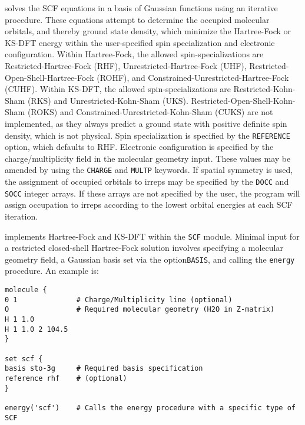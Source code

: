 \PSIfour solves the SCF equations in a basis of Gaussian functions using an
iterative procedure. These equations attempt to determine the occupied molecular
orbitals, and thereby ground state density, which minimize the Hartree-Fock or
KS-DFT energy within the user-specified spin specialization and electronic
configuration. Within Hartree-Fock, the allowed spin-specializations are
Restricted-Hartree-Fock (RHF), Unrestricted-Hartree-Fock (UHF),
Restricted-Open-Shell-Hartree-Fock (ROHF), and
Constrained-Unrestricted-Hartree-Fock (CUHF). Within KS-DFT, the allowed
spin-specializations are Restricted-Kohn-Sham (RKS) and Unrestricted-Kohn-Sham
(UKS). Restricted-Open-Shell-Kohn-Sham (ROKS) and
Constrained-Unrestricted-Kohn-Sham (CUKS) are not implemented, as they always
predict a ground state with positive definite spin density, which is not
physical. Spin specialization is specified by the \texttt{REFERENCE} option,
which defaults to RHF.
Electronic configuration is specified by the charge/multiplicity field in the
molecular geometry input. These values may be amended by using the
\texttt{CHARGE} and \texttt{MULTP} keywords. If spatial symmetry is used, the
assignment of occupied orbitals to irreps may be specified by the \texttt{DOCC}
and \texttt{SOCC} integer arrays. If these arrays are not specified by the user,
the program will assign occupation to irreps according to the lowest orbital
energies at each SCF iteration.  

\PSIfour implements Hartree-Fock and KS-DFT within the \texttt{SCF} module.
Minimal input for a restricted closed-shell Hartree-Fock solution involves
specifying a molecular geometry field, a Gaussian basis set via the
option\texttt{BASIS}, and calling the \texttt{energy} procedure. An example is:
\begin{verbatim}
molecule {
0 1              # Charge/Multiplicity line (optional)
O                # Required molecular geometry (H2O in Z-matrix)
H 1 1.0
H 1 1.0 2 104.5
}

set scf {        
basis sto-3g     # Required basis specification
reference rhf    # (optional)
}

energy('scf')    # Calls the energy procedure with a specific type of SCF
\end{verbatim}

